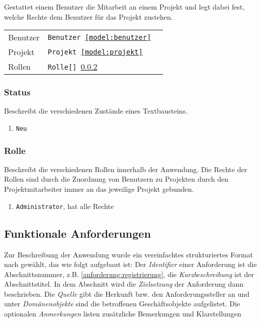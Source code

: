 Gestattet einem Benutzer die Mitarbeit an einem Projekt und legt dabei fest, welche Rechte dem Benutzer für das Projekt zustehen.

\begin{tabular}{@{}l l l}
\hline
Benutzer&\texttt{Benutzer \ref{model:benutzer}}&\\
Projekt&\texttt{Projekt \ref{model:projekt}}&\\
Rollen&\texttt{Rolle[] \ref{model:rolle}}&\\
\hline
\end{tabular}

\subsubsection{Status}\label{model:status}

Beschreibt die verschiedenen Zustände eines Textbausteins.

\begin{enumerate}\itemsep -5pt
\item \texttt{Neu}
\end{enumerate}

\subsubsection{Rolle}\label{model:rolle}

Beschreibt die verschiedenen Rollen innerhalb der Anwendung. Die Rechte der Rollen sind durch die Zuordnung von Benutzern zu Projekten durch den Projektmitarbeiter immer an das jeweilige Projekt gebunden.

\begin{enumerate}\itemsep -5pt
\item \texttt{Administrator}, hat alle Rechte 
\end{enumerate}

\subsection{Funktionale Anforderungen}\label{l:funktionale-anforderungen}

Zur Beschreibung der Anwendung wurde ein vereinfachtes strukturiertes Format nach \cite[S.151~ff.]{schienmann2002kontinuierliches} gewählt, das wie folgt aufgebaut ist: Der \emph{Identifier} einer Anforderung ist die Abschnittsnummer, z.B. \ref{anforderung:registrierung},  die \emph{Kurzbeschreibung} ist der Abschnittstitel. In dem Abschnitt wird die \emph{Zielsetzung} der Anforderung dann beschrieben. Die \emph{Quelle} gibt die Herkunft bzw. den Anforderungssteller an und unter \emph{Domänenobjekte} sind die betroffenen Geschäftsobjekte aufgelistet. Die optionalen \emph{Anmerkungen} listen zusätzliche Bemerkungen und Klarstellungen

